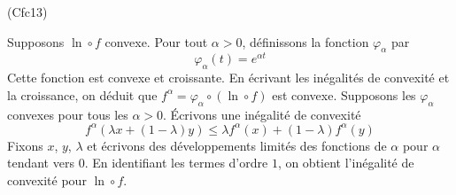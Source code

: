 \begin{tiny}(Cfc13)\end{tiny} Supposons $\ln \circ f$ convexe. Pour tout $\alpha >0$, définissons la fonction $\varphi_\alpha$ par
\begin{displaymath}
 \varphi_\alpha(t)=e^{\alpha t}
\end{displaymath}
Cette fonction est convexe et croissante. En écrivant les inégalités de convexité et la croissance, on déduit que $f^\alpha =  \varphi_\alpha \circ (\ln \circ f)$ est convexe.
Supposons les $\varphi_\alpha$ convexes pour tous les $\alpha>0$. \'Ecrivons une inégalité de convexité
\begin{displaymath}
 f^\alpha(\lambda x+(1-\lambda)y)\leq \lambda f^\alpha(x)+(1-\lambda)f^\alpha(y)
\end{displaymath}
Fixons $x$, $y$, $\lambda$ et écrivons des développements limités des fonctions de $\alpha$ pour $\alpha$ tendant vers $0$. En identifiant les termes d'ordre $1$, on obtient l'inégalité de convexité pour $\ln\circ f$.